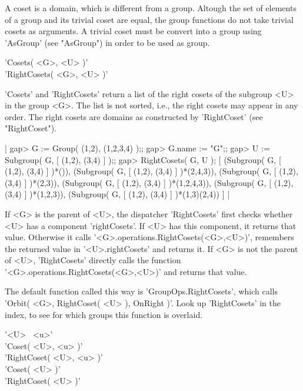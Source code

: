 A coset is a {\GAP} domain, which is different from a group.  Altough the
set  of elements of a group and  its trivial coset  are  equal, the group
functions do not take trivial cosets as arguments.  A  trivial coset must
be convert  into a  group using 'AsGroup' (see "AsGroup")  in order to be
used as group.

%

'Cosets( <G>, <U> )' \\
'RightCosets( <G>, <U> )'

'Cosets' and  'RightCosets' return  a list of   the right  cosets  of the
subgroup <U> in the group <G>.  The  list is not  sorted, i.e., the right
cosets  may  appear in   any  order.  The  right   cosets are domains  as
constructed by 'RightCoset' (see "RightCoset").

|    gap> G := Group( (1,2), (1,2,3,4) );;
    gap> G.name := "G";;
    gap> U := Subgroup( G, [ (1,2), (3,4) ] );;
    gap> RightCosets( G, U );
    [ (Subgroup( G, [ (1,2), (3,4) ] )*()), 
      (Subgroup( G, [ (1,2), (3,4) ] )*(2,4,3)), 
      (Subgroup( G, [ (1,2), (3,4) ] )*(2,3)), 
      (Subgroup( G, [ (1,2), (3,4) ] )*(1,2,4,3)), 
      (Subgroup( G, [ (1,2), (3,4) ] )*(1,2,3)), 
      (Subgroup( G, [ (1,2), (3,4) ] )*(1,3)(2,4)) ] |

If <G> is  the parent of  <U>, the dispatcher  'RightCosets' first checks
whether <U> has a component 'rightCosets'.  If <U> has this component, it
returns        that       value.         Otherwise        it        calls
'<G>.operations.RightCosets(<G>,<U>)',  remembers the  returned value  in
'<U>.rightCosets' and returns  it.   If  <G>  is not the parent  of  <U>,
'RightCosets'         directly         calls         the         function
'<G>.operations.RightCosets(<G>,<U>)' and returns that value.

The  default function called  this  way is 'GroupOps.RightCosets',  which
calls 'Orbit( <G>, RightCoset( <U> ), OnRight  )'.  Look up 'RightCosets'
in the index, to see for which groups this function is overlaid.

%
%

'<U> \*\ <u>' \\
'Coset( <U>, <u> )' \\
'RightCoset( <U>, <u> )' \\
'Coset( <U> )' \\
'RightCoset( <U> )'

